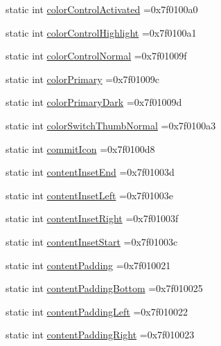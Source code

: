 \begin{DoxyCompactItemize}
\item 
static int \hyperlink{classandroid_1_1support_1_1v4_1_1R_1_1attr_a6189299faafd419a42d52ab33d2fbe35}{color\+Control\+Activated} =0x7f0100a0
\item 
static int \hyperlink{classandroid_1_1support_1_1v4_1_1R_1_1attr_ad8a8cfc0cf93dff590afe93fe48695cb}{color\+Control\+Highlight} =0x7f0100a1
\item 
static int \hyperlink{classandroid_1_1support_1_1v4_1_1R_1_1attr_a0f9de63df4df6b2c04f5544914e7b6ae}{color\+Control\+Normal} =0x7f01009f
\item 
static int \hyperlink{classandroid_1_1support_1_1v4_1_1R_1_1attr_af2f3bec0516073795645916be3a7eca5}{color\+Primary} =0x7f01009c
\item 
static int \hyperlink{classandroid_1_1support_1_1v4_1_1R_1_1attr_a6fc63ddfec27d2e1ddf500bd17b1d8b5}{color\+Primary\+Dark} =0x7f01009d
\item 
static int \hyperlink{classandroid_1_1support_1_1v4_1_1R_1_1attr_a6028fce7673c59e3b4d6dec1bc997df8}{color\+Switch\+Thumb\+Normal} =0x7f0100a3
\item 
static int \hyperlink{classandroid_1_1support_1_1v4_1_1R_1_1attr_aaaa25c2285a9f33ef704eaed37165397}{commit\+Icon} =0x7f0100d8
\item 
static int \hyperlink{classandroid_1_1support_1_1v4_1_1R_1_1attr_af8f89d4cff9e410c8d717f6c8dd01b0c}{content\+Inset\+End} =0x7f01003d
\item 
static int \hyperlink{classandroid_1_1support_1_1v4_1_1R_1_1attr_ae2b4db4a6417ce171035f616b2fa4d20}{content\+Inset\+Left} =0x7f01003e
\item 
static int \hyperlink{classandroid_1_1support_1_1v4_1_1R_1_1attr_aae1b287277312b537031bed0d24863b0}{content\+Inset\+Right} =0x7f01003f
\item 
static int \hyperlink{classandroid_1_1support_1_1v4_1_1R_1_1attr_a271705b242fb5e101f893f6821b0149f}{content\+Inset\+Start} =0x7f01003c
\item 
static int \hyperlink{classandroid_1_1support_1_1v4_1_1R_1_1attr_a535fdec02c81c64089fb34983715bbd7}{content\+Padding} =0x7f010021
\item 
static int \hyperlink{classandroid_1_1support_1_1v4_1_1R_1_1attr_ac85f05250c0d2d5292eeff7d7eb0f798}{content\+Padding\+Bottom} =0x7f010025
\item 
static int \hyperlink{classandroid_1_1support_1_1v4_1_1R_1_1attr_a8968321b1f9c0babb9646f431ece6294}{content\+Padding\+Left} =0x7f010022
\item 
static int \hyperlink{classandroid_1_1support_1_1v4_1_1R_1_1attr_af6d3428e88c6646dba8ee41c07f71d8c}{content\+Padding\+Right} =0x7f010023

\end{DoxyCompactItemize}
